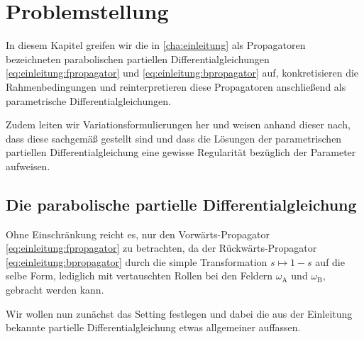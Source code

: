 
\chapter{Problemstellung} %
\label{cha:parametrische_problem_neuer_versuch}

In diesem Kapitel greifen wir die in \autoref{cha:einleitung} als Propagatoren bezeichneten parabolischen partiellen Differentialgleichungen \eqref{eq:einleitung:fpropagator} und \eqref{eq:einleitung:bpropagator} auf, konkretisieren die Rahmenbedingungen und reinterpretieren diese Propagatoren anschließend als parametrische Differentialgleichungen.

Zudem leiten wir Variationsformulierungen her und weisen anhand dieser nach, dass diese sachgemäß gestellt sind und dass die Lösungen der parametrischen partiellen Differentialgleichung eine gewisse Regularität bezüglich der Parameter aufweisen.


\section{Die parabolische partielle Differentialgleichung} %
\label{sec:die_parabolische_partielle_differentialgleichung}

Ohne Einschränkung reicht es, nur den Vorwärts-Propagator \eqref{eq:einleitung:fpropagator} zu betrachten, da der Rückwärts-Propagator \eqref{eq:einleitung:bpropagator} durch die simple Transformation $s \mapsto 1 - s$ auf die selbe Form, lediglich mit vertauschten Rollen bei den Feldern $\omega_{\mathrm{A}}$ und $\omega_{\mathrm{B}}$, gebracht werden kann.

Wir wollen nun zunächst das Setting festlegen und dabei die aus der Einleitung bekannte partielle Differentialgleichung etwas allgemeiner auffassen.

